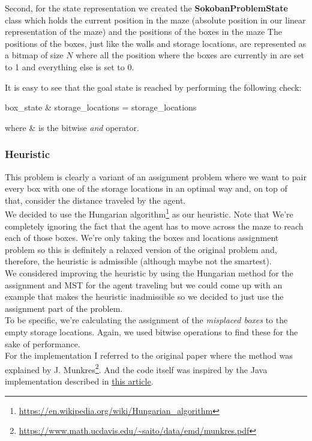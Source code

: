 \documentclass[11pt]{article}
\begin{document}
Second, for the state representation we created the \textbf{SokobanProblemState} class which holds the current position in the maze (absolute position in our linear representation of the maze) and the positions of the boxes in the maze The positions of the boxes, just like the walls and storage locations, are represented as a bitmap of size $N$ where all the position where the boxes are currently in are set to 1 and everything else is set to 0.\\

\pagebreak

It is easy to see that the goal state is reached by performing the following check:\\
\begin{center}
box\_state \& storage\_locations = storage\_locations
\end{center}
where \& is the bitwise \textit{and} operator.\\

\subsubsection*{Heuristic}
This problem is clearly a variant of an assignment problem where we want to pair every box with one of the storage locations in an optimal way and, on top of that, consider the distance traveled by the agent. \\
We decided to use the Hungarian algorithm\footnote{\url{https://en.wikipedia.org/wiki/Hungarian\_algorithm}} as our heuristic. Note that We're completely ignoring the fact that the agent has to move across the maze to reach each of those boxes. We're only taking the boxes and locations assignment problem so this is definitely a relaxed version of the original problem and, therefore, the heuristic is admissible (although maybe not the smartest).\\

We considered improving the heuristic by using the Hungarian method for the assignment and MST for the agent traveling but we could come up with an example that makes the heuristic inadmissible so we decided to just use the assignment part of the problem.\\

To be specific, we're calculating the assignment of the \textit{misplaced boxes} to the empty storage locations. Again, we used bitwise operations to find these for the sake of performance.\\

For the implementation I referred to the original paper where the method was explained by J. Munkres\footnote{\url{https://www.math.ucdavis.edu/~saito/data/emd/munkres.pdf}}. And the code itself was inspired by the Java implementation described in \href{http://csclab.murraystate.edu/~bob.pilgrim/445/munkres.html}{this article}.
\end{document}
